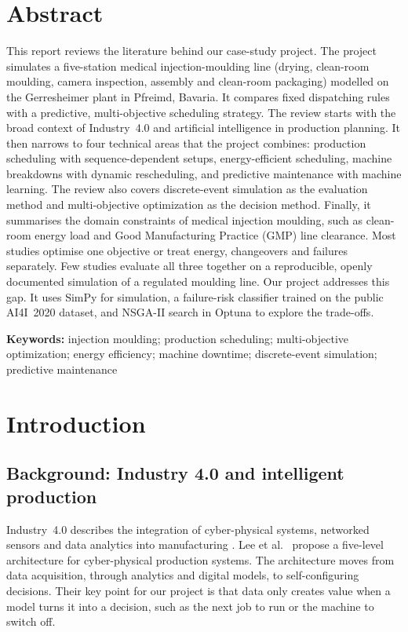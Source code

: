 \documentclass[11pt,a4paper]{article}
\begin{document}
\section*{Abstract}
This report reviews the literature behind our case-study project. The project simulates a five-station medical injection-moulding line (drying, clean-room moulding, camera inspection, assembly and clean-room packaging) modelled on the Gerresheimer plant in Pfreimd, Bavaria. It compares fixed dispatching rules with a predictive, multi-objective scheduling strategy. The review starts with the broad context of Industry~4.0 and artificial intelligence in production planning. It then narrows to four technical areas that the project combines: production scheduling with sequence-dependent setups, energy-efficient scheduling, machine breakdowns with dynamic rescheduling, and predictive maintenance with machine learning. The review also covers discrete-event simulation as the evaluation method and multi-objective optimization as the decision method. Finally, it summarises the domain constraints of medical injection moulding, such as clean-room energy load and Good Manufacturing Practice (GMP) line clearance. Most studies optimise one objective or treat energy, changeovers and failures separately. Few studies evaluate all three together on a reproducible, openly documented simulation of a regulated moulding line. Our project addresses this gap. It uses SimPy for simulation, a failure-risk classifier trained on the public AI4I~2020 dataset, and NSGA-II search in Optuna to explore the trade-offs.

\vspace{0.5em}
\textbf{Keywords:} injection moulding; production scheduling; multi-objective optimization; energy efficiency; machine downtime; discrete-event simulation; predictive maintenance

\newpage
\tableofcontents
\newpage
\listoftables
\listoffigures
\newpage

\section{Introduction}
\subsection{Background: Industry 4.0 and intelligent production}
Industry~4.0 describes the integration of cyber-physical systems, networked sensors and data analytics into manufacturing \cite{kagermann2013}. Lee et al.\ \cite{lee2015} propose a five-level architecture for cyber-physical production systems. The architecture moves from data acquisition, through analytics and digital models, to self-configuring decisions. Their key point for our project is that data only creates value when a model turns it into a decision, such as the next job to run or the machine to switch off.
\end{document}
